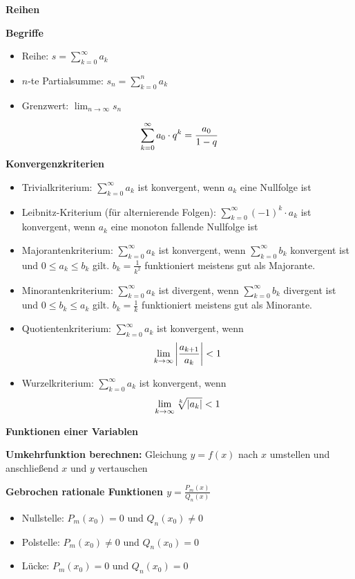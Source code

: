 \documentclass[10pt,landscape,a4paper]{article}
\begin{document}
\begin{multicols*}{4}
\begin{center}
	\normalsize{\textbf{Reihen}}
\end{center}
\textbf{Begriffe}
\begin{itemize}
	\item Reihe: $s=\sum_{k=0}^{\infty} a_k$
	\item $n$-te Partialsumme: $s_n=\sum_{k=0}^{n} a_k$
	\item Grenzwert: $\lim_{n\to\infty} s_n$
\end{itemize}
\begin{align}
	\sum_{k=0}^\infty a_0\cdot q^k = \frac{a_0}{1-q} \notag
\end{align}
\textbf{Konvergenzkriterien}
\begin{itemize}
	\item Trivialkriterium: $\sum_{k=0}^{\infty} a_k$ ist konvergent, wenn $a_k$ eine Nullfolge ist
	\item Leibnitz-Kriterium (für alternierende Folgen): $\sum_{k=0}^{\infty} (-1)^k\cdot a_k$ ist konvergent, wenn $a_k$ eine monoton fallende Nullfolge ist
	\item Majorantenkriterium: $\sum_{k=0}^{\infty} a_k$ ist konvergent, wenn $\sum_{k=0}^{\infty} b_k$ konvergent ist und $0\le a_k\le b_k$ gilt. $b_k=\frac{1}{k^2}$ funktioniert meistens gut als Majorante.
	\item Minorantenkriterium: $\sum_{k=0}^{\infty} a_k$ ist divergent, wenn $\sum_{k=0}^{\infty} b_k$ divergent ist und $0\le b_k\le a_k$ gilt. $b_k=\frac{1}{k}$ funktioniert meistens gut als Minorante.
	\item Quotientenkriterium: $\sum_{k=0}^{\infty} a_k$ ist konvergent, wenn
	\begin{align}
		\lim_{k\to\infty}\left\vert\frac{a_{k+1}}{a_k}\right\vert<1 \notag
	\end{align}
	\item Wurzelkriterium: $\sum_{k=0}^{\infty} a_k$ ist konvergent, wenn
	\begin{align}
		\lim_{k\to\infty}\sqrt[k]{\vert a_k\vert} <1 \notag
	\end{align}
\end{itemize}

\begin{center}
	\normalsize{\textbf{Funktionen einer Variablen}}
\end{center}
\textbf{Umkehrfunktion berechnen:} Gleichung $y=f(x)$ nach $x$ umstellen und anschließend $x$ und $y$ vertauschen

\textbf{Gebrochen rationale Funktionen $y=\frac{P_m(x)}{Q_n(x)}$}
\begin{itemize}
	\item Nullstelle: $P_m(x_0)=0$ und $Q_n(x_0)\neq 0$
	\item Polstelle: $P_m(x_0)\neq 0$ und $Q_n(x_0)=0$
	\item Lücke: $P_m(x_0)=0$ und $Q_n(x_0)=0$
\end{itemize}


\end{multicols*}
\end{document}

